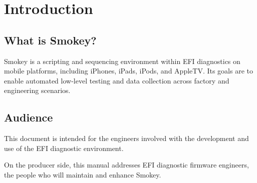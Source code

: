 

\section{Introduction}

\subsection{What is Smokey?}

Smokey is a scripting and sequencing environment within EFI diagnostics on
mobile platforms, including iPhones, iPads, iPods, and AppleTV.  Its goals are
to enable automated low-level testing and data collection across factory and
engineering scenarios.

\subsection{Audience}

This document is intended for the engineers involved with the development and
use of the EFI diagnostic environment.

On the producer side, this manual addresses EFI diagnostic firmware engineers,
the people who will maintain and enhance Smokey.


